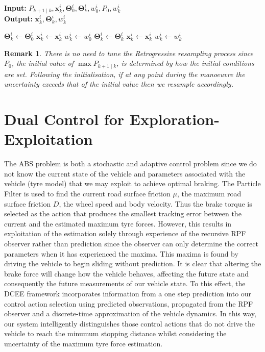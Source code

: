 \documentclass[onecolumn,journal,draftclsnofoot]{IEEEtran}
\newtheorem{remark}{Remark}
\begin{document}
\begin{algorithm} %
\caption{Retrogressive Resampling}\label{alg:retro}
 \hspace*{\algorithmicindent} \textbf{Input:}  \({P}_{k+1 \mid k},{\mathbf{x}}^i_k,\mathbf{\Theta}_0^i,\mathbf{\Theta}_k^i,w^i_0,P_0,w_{k}^i\)\\
 \hspace*{\algorithmicindent} \textbf{Output:} \( {\mathbf{x}}^i_k,\mathbf{\Theta}_k^i,w_k^i\)
\begin{algorithmic}[1]
        \STATE \( \mathbf{\Theta}_k^i \gets \mathbf{\Theta}_0^i\)
        \STATE \({\mathbf{x}}_{k}^i \gets \mathbf{x}^i_{k}\)
        \STATE \({w}_{k}^i \gets w^i_0\)
    \ELSE
        \STATE \( \mathbf{\Theta}_k^i \gets \mathbf{\Theta}_k^i\)
        \STATE \({\mathbf{x}}_{k}^i \gets \mathbf{x}^i_{k}\)
        \STATE \({w}_{k}^i \gets w^i_k\)
    \ENDIF
\end{algorithmic}
\end{algorithm}

\begin{remark}
There is no need to tune the Retrogressive resampling process  since \(P_0\), the initial value of \(\max{{P}_{k+1 \mid k}}\), is determined by how the initial conditions are set. Following the initialisation, if at any point during the manoeuvre the uncertainty exceeds that of the initial value then we resample accordingly. 
\end{remark}

\section{Dual Control for Exploration-Exploitation}\label{sec:dcee} \label{DCEE}
The ABS problem is both a stochastic and adaptive control problem since we do not know the current state of the vehicle and parameters associated with the vehicle (tyre model) that we may exploit to achieve optimal braking.
The Particle Filter is used to find the current road surface friction \(\mu\), the maximum road surface friction \(D\), the wheel speed and body velocity. 
Thus the brake torque is selected as the action that produces the smallest tracking error between the current and the estimated maximum tyre forces.
However, this results in exploitation of the estimation solely through experience of the recursive RPF observer rather than prediction since the observer can only determine the correct parameters when it has experienced the maxima. This maxima is found by driving the vehicle to begin sliding without prediction.
It is clear that altering the brake force will change how the vehicle behaves, affecting the future state and consequently the future measurements of our vehicle state.
To this effect, the DCEE framework incorporates information from a one step prediction into our control action selection using predicted observations, propagated from the RPF observer and a discrete-time approximation of the vehicle dynamics. 
In this way, our system intelligently distinguishes those control actions that do not drive the vehicle to reach the minumum stopping distance whilst considering the uncertainty of the maximum tyre force estimation.
\end{document}
